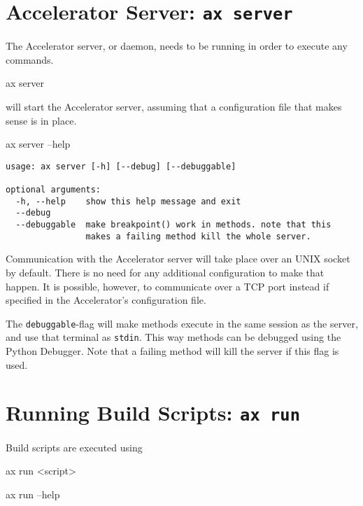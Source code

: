 \section{Accelerator Server: \texttt{ax server}}
\label{sec:axserver}
The Accelerator server, or daemon, needs to be running in order to
execute any commands.
\begin{shell}
ax server
\end{shell}
will start the Accelerator server, assuming that a configuration file
that makes sense is in place.
\begin{shell}
ax server --help
\end{shell}
\begin{snugshade}
\begin{verbatim}
usage: ax server [-h] [--debug] [--debuggable]

optional arguments:
  -h, --help    show this help message and exit
  --debug
  --debuggable  make breakpoint() work in methods. note that this
                makes a failing method kill the whole server.
\end{verbatim}%
\end{snugshade}
Communication with the Accelerator server will take place over an UNIX
socket by default.  There is no need for any additional configuration
to make that happen.  It is possible, however, to communicate over a
TCP port instead if specified in the Accelerator's configuration file.

The \texttt{debuggable}-flag will make methods execute in the same
session as the server, and use that terminal as \texttt{stdin}.  This
way methods can be debugged using the Python Debugger.  Note that a
failing method will kill the server if this flag is used.



\section{Running Build Scripts: \texttt{ax run}}
\label{sec:exec_runner}
Build scripts are executed using
\begin{python}
ax run <script>
\end{python}

\begin{python}
ax run --help
\end{python}

